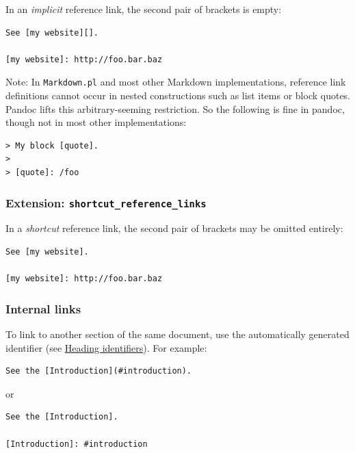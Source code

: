 \documentclass[
]{article}
\begin{document}
In an \emph{implicit} reference link, the second pair of brackets is
empty:

\begin{verbatim}
See [my website][].

[my website]: http://foo.bar.baz
\end{verbatim}

Note: In \texttt{Markdown.pl} and most other Markdown implementations,
reference link definitions cannot occur in nested constructions such as
list items or block quotes. Pandoc lifts this arbitrary-seeming
restriction. So the following is fine in pandoc, though not in most
other implementations:

\begin{verbatim}
> My block [quote].
>
> [quote]: /foo
\end{verbatim}

\hypertarget{extension-shortcut_reference_links}{%
\subsubsection{\texorpdfstring{Extension:
\texttt{shortcut\_reference\_links}}{Extension: shortcut\_reference\_links}}\label{extension-shortcut_reference_links}}

In a \emph{shortcut} reference link, the second pair of brackets may be
omitted entirely:

\begin{verbatim}
See [my website].

[my website]: http://foo.bar.baz
\end{verbatim}

\hypertarget{internal-links}{%
\subsubsection{Internal links}\label{internal-links}}

To link to another section of the same document, use the automatically
generated identifier (see
\protect\hyperlink{heading-identifiers}{Heading identifiers}). For
example:

\begin{verbatim}
See the [Introduction](#introduction).
\end{verbatim}

or

\begin{verbatim}
See the [Introduction].

[Introduction]: #introduction
\end{verbatim}
\end{document}
